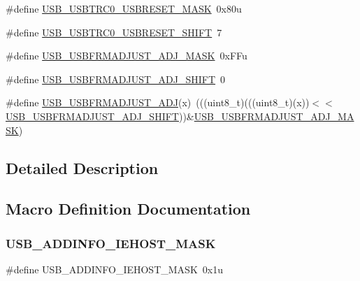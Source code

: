 \begin{DoxyCompactItemize}
\item 
\#define \hyperlink{group___u_s_b___register___masks_ga3b307f8358be6942775121b6a92243ab}{U\+S\+B\+\_\+\+U\+S\+B\+T\+R\+C0\+\_\+\+U\+S\+B\+R\+E\+S\+E\+T\+\_\+\+M\+A\+SK}~0x80u
\item 
\#define \hyperlink{group___u_s_b___register___masks_gab20fcb9276a34cbbd33ac0364c419f13}{U\+S\+B\+\_\+\+U\+S\+B\+T\+R\+C0\+\_\+\+U\+S\+B\+R\+E\+S\+E\+T\+\_\+\+S\+H\+I\+FT}~7
\item 
\#define \hyperlink{group___u_s_b___register___masks_ga3bbdc3dbdf46947a16a7b4429ad9a0c7}{U\+S\+B\+\_\+\+U\+S\+B\+F\+R\+M\+A\+D\+J\+U\+S\+T\+\_\+\+A\+D\+J\+\_\+\+M\+A\+SK}~0x\+F\+Fu
\item 
\#define \hyperlink{group___u_s_b___register___masks_ga81985f8c59f9aa0c0340a70136b55098}{U\+S\+B\+\_\+\+U\+S\+B\+F\+R\+M\+A\+D\+J\+U\+S\+T\+\_\+\+A\+D\+J\+\_\+\+S\+H\+I\+FT}~0
\item 
\#define \hyperlink{group___u_s_b___register___masks_ga9425a289b2e719d6aad583a33ddf1e4b}{U\+S\+B\+\_\+\+U\+S\+B\+F\+R\+M\+A\+D\+J\+U\+S\+T\+\_\+\+A\+DJ}(x)~(((uint8\+\_\+t)(((uint8\+\_\+t)(x))$<$$<$\hyperlink{group___u_s_b___register___masks_ga81985f8c59f9aa0c0340a70136b55098}{U\+S\+B\+\_\+\+U\+S\+B\+F\+R\+M\+A\+D\+J\+U\+S\+T\+\_\+\+A\+D\+J\+\_\+\+S\+H\+I\+FT}))\&\hyperlink{group___u_s_b___register___masks_ga3bbdc3dbdf46947a16a7b4429ad9a0c7}{U\+S\+B\+\_\+\+U\+S\+B\+F\+R\+M\+A\+D\+J\+U\+S\+T\+\_\+\+A\+D\+J\+\_\+\+M\+A\+SK})
\end{DoxyCompactItemize}


\subsection{Detailed Description}


\subsection{Macro Definition Documentation}
\mbox{\label{group___u_s_b___register___masks_gacb7c792034c73c4861bc8fba6ff4314f}} 
\subsubsection{\texorpdfstring{U\+S\+B\+\_\+\+A\+D\+D\+I\+N\+F\+O\+\_\+\+I\+E\+H\+O\+S\+T\+\_\+\+M\+A\+SK}{USB\_ADDINFO\_IEHOST\_MASK}}
{\footnotesize\ttfamily \#define U\+S\+B\+\_\+\+A\+D\+D\+I\+N\+F\+O\+\_\+\+I\+E\+H\+O\+S\+T\+\_\+\+M\+A\+SK~0x1u}

